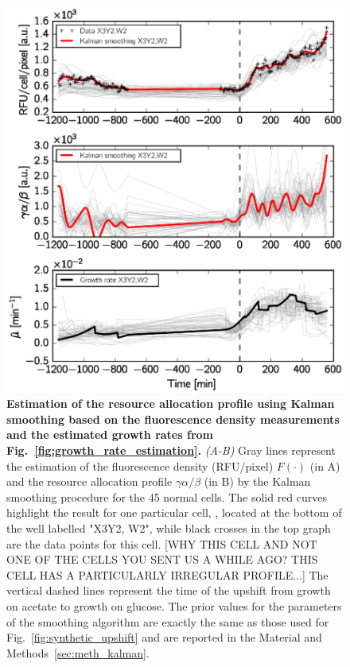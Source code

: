 \begin{figure}[p]
\centering
\includegraphics[scale=1]{./Fig/gene_activity}
\caption{
\textbf{Estimation of the resource allocation profile using Kalman smoothing based on the fluorescence density measurements and the estimated growth rates from Fig.~\ref{fig:growth_rate_estimation}.}
\textit{(A-B)} Gray lines represent the estimation of the fluorescence density (RFU/pixel) $F(\cdot)$ (in A) and the resource allocation profile $\gamma \alpha / \beta$ (in B) by the Kalman smoothing procedure for the 45 normal cells.
The solid red curves highlight the result for one particular cell, , located at the bottom of the well labelled "X3Y2, W2", while black crosses in the top graph are the data points for this cell. [WHY THIS CELL AND NOT ONE OF THE CELLS YOU SENT US A WHILE AGO? THIS CELL HAS A PARTICULARLY IRREGULAR PROFILE...]
The vertical dashed lines represent the time of the upshift from growth on acetate to growth on glucose.
The prior values for the parameters of the smoothing algorithm are exactly the same as those used for Fig.~\ref{fig:synthetic_upshift} and are reported in the Material and Methods~\ref{sec:meth_kalman}.
}
\label{fig:gene_activity}
\end{figure}

